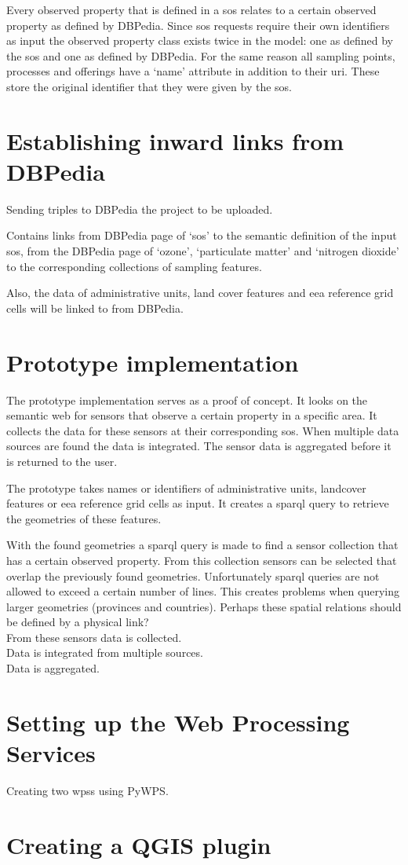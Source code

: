 Every observed property that is defined in a \ac{sos} relates to a certain observed property as defined by DBPedia. Since \ac{sos} requests require their own identifiers as input the observed property class exists twice in the model: one as defined by the \ac{sos} and one as defined by DBPedia. For the same reason all sampling points, processes and offerings have a `name' attribute in addition to their \ac{uri}. These store the original identifier that they were given by the \ac{sos}.

\section{Establishing inward links from DBPedia}
Sending triples to DBPedia the project to be uploaded.

Contains links from DBPedia page of `\acl{sos}' to the semantic definition of the input \ac{sos}, from the DBPedia page of `ozone', `particulate matter' and `nitrogen dioxide' to the corresponding collections of sampling features.

Also, the data of administrative units, land cover features and \ac{eea} reference grid cells will be linked to from DBPedia.

\section{Prototype implementation}
The prototype implementation serves as a proof of concept. It looks on the semantic web for sensors that observe a certain property in a specific area. It collects the data for these sensors at their corresponding \acl{sos}. When multiple data sources are found the data is integrated. The sensor data is aggregated before it is returned to the user.

The prototype takes names or identifiers of administrative units, landcover features or \ac{eea} reference grid cells as input. It creates a \ac{sparql} query to retrieve the geometries of these features. 

With the found geometries a \ac{sparql} query is made to find a sensor collection that has a certain observed property. From this collection sensors can be selected that overlap the previously found geometries. Unfortunately \ac{sparql} queries are not allowed to exceed a certain number of lines. This creates problems when querying larger geometries (provinces and countries). Perhaps these spatial relations should be defined by a physical link? \\

From these sensors data is collected. \\

Data is integrated from multiple sources.\\

Data is aggregated.

\section{Setting up the Web Processing Services}
Creating two \aclp{wps} using PyWPS.

\section{Creating a QGIS plugin}
